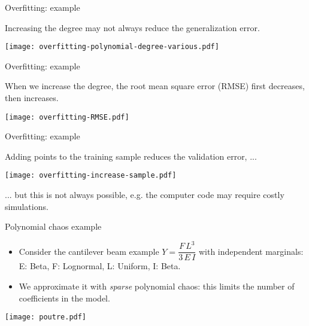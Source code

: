 \documentclass{beamer}
\begin{document}

\begin{frame}[t]{Overfitting: example}

Increasing the degree may not always reduce the generalization error. 

\begin{center}
 \texttt{[image: overfitting-polynomial-degree-various.pdf]}
\end{center}

\end{frame}


\begin{frame}[t]{Overfitting: example}

When we increase the degree, the root mean square error (RMSE) 
first decreases, then increases. 

\begin{center}
 \texttt{[image: overfitting-RMSE.pdf]}
\end{center}

\end{frame}


\begin{frame}[t]{Overfitting: example}

Adding points to the training sample reduces the validation error, ...

\begin{center}
 \texttt{[image: overfitting-increase-sample.pdf]}
\end{center}

... but this is not always possible, e.g. the computer code may require 
costly simulations. 

\end{frame}


\begin{frame}[t]{Polynomial chaos example}

\begin{example}
\begin{itemize}
\item Consider the cantilever beam example $Y  = \dfrac{F\, L^3}{3 \, E \, I}$
with independent marginals: E: Beta, F: Lognormal, L: Uniform, 
I: Beta.

\item We approximate it with \emph{sparse} polynomial chaos: this limits 
the number of coefficients in the model.
\end{itemize}

\end{example}

\begin{center}
 \texttt{[image: poutre.pdf]}
\end{center}

\end{frame}
\end{document}
